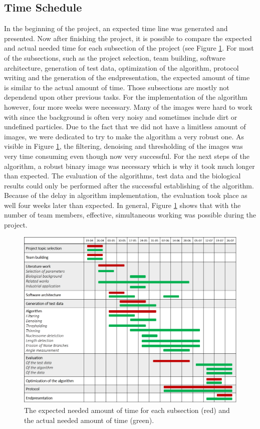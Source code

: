 \documentclass{article}
\begin{document}
\subsection{Time Schedule}
 In the beginning of the project, an expected time line was generated and presented. Now after finishing the project, it is possible to compare the expected and actual needed time for each subsection of the project (see Figure \ref{fig: timeline}. 
For most of the subsections, such as the project selection, team building, software architecture, generation of test data, optimization of the algorithm, protocol writing and the generation of the endpresentation, the expected amount of time is similar to the actual amount of time. Those subsections are mostly not dependend upon other previous tasks. 
For the implementation of the algorithm however, four more weeks were necessary. Many of the images were hard to work with since the background is often very noisy and sometimes include dirt or undefined particles. Due to the fact that we did not have a limitless amount of images, we were dedicated to try to make the algorithm a very robust one. As visible in Figure \ref{fig: timeline}, the filtering, denoising and thresholding of the images was very time consuming even though now very successful. For the next steps of the algorithm, a robust binary image was necessary which is why it took much longer than expected. 
The evaluation of the algorithms, test data and the biological results could only be performed after the successful establishing of the algorithm. Because of the delay in algorithm implementation, the evaluation took place as well four weeks later than expected. 
In general, Figure \ref{fig: timeline} shows that with the number of team members, effective, simultaneous working was possible during the project. 
\begin{figure}[htb]
\begin{center}
\includegraphics[width = \textwidth]{timeline2.png}
\end{center}
\caption{The expected needed amount of time for each subsection (red) and the actual needed amount of time (green).}
\label{fig: timeline} 
\end{figure}
\end{document}
